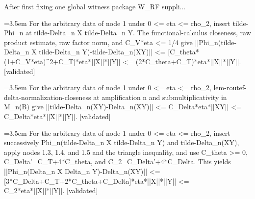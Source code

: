 \documentclass{article}
\newcommand{\step}[1]{\par\noindent\hangindent=3.5em\hangafter=1%
  \makebox[3.5em][l]{\textbf{#1.}}}
\newcommand{\steptag}[1]{\hfill{\small\textsf{[#1]}}}
\begin{document}
\begin{proofbox}{After first fixing one global witness package W\_RF suppli...}
\step{1.4} For the arbitrary data of node 1 under 0 <= eta <= rho\_2, insert tilde-Phi\_n at tilde-Delta\_n X tilde-Delta\_n Y. The functional-calculus closeness, raw product estimate, raw factor norm, and C\_V*eta <= 1/4 give ||Phi\_n(tilde-Delta\_n X tilde-Delta\_n Y)-tilde-Delta\_n(XY)|| <= [C\_theta*(1+C\_V*eta)\textasciicircum{}2+C\_T]*eta*||X||*||Y|| <= (2*C\_theta+C\_T)*eta*||X||*||Y||. \steptag{validated} \\[4pt]
\step{1.5} For the arbitrary data of node 1 under 0 <= eta <= rho\_2, lem-routef-delta-normalization-closeness at amplification n and submultiplicativity in M\_n(B) give ||tilde-Delta\_n(XY)-Delta\_n(XY)|| <= C\_Delta*eta*||XY|| <= C\_Delta*eta*||X||*||Y||. \steptag{validated} \\[4pt]
\step{1.6} For the arbitrary data of node 1 under 0 <= eta <= rho\_2, insert successively Phi\_n(tilde-Delta\_n X tilde-Delta\_n Y) and tilde-Delta\_n(XY), apply nodes 1.3, 1.4, and 1.5 and the triangle inequality, and use C\_theta >= 0, C\_Delta'=C\_T+4*C\_theta, and C\_2=C\_Delta'+4*C\_Delta. This yields ||Phi\_n(Delta\_n X Delta\_n Y)-Delta\_n(XY)|| <= [3*C\_Delta+C\_T+2*C\_theta+C\_Delta]*eta*||X||*||Y|| <= C\_2*eta*||X||*||Y||. \steptag{validated} \\[4pt]
\end{proofbox}
\end{document}
